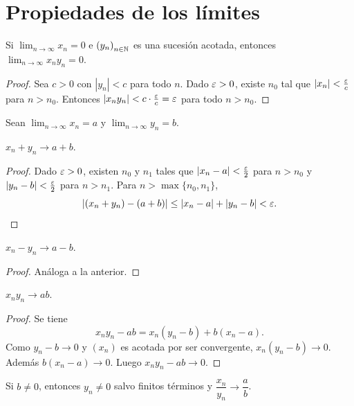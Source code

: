\section{Propiedades de los límites}

\begin{theorem}
  Si \(\lim_{n \to \infty} x_n = 0\) e \({(y_n)}_{n \in \mathbb{N}}\) es una sucesión acotada, entonces \(\lim_{n \to \infty} x_n y_n = 0\).
\end{theorem}

\begin{proof}
  Sea \(c > 0\) con \(|y_n| < c\) para todo \(n\). Dado \(\varepsilon > 0\), existe \(n_0\) tal que \(|x_n| < \frac{\varepsilon}{c}\) para \(n > n_0\). Entonces \(|x_n y_n| < c \cdot \frac{\varepsilon}{c} = \varepsilon\) para todo \(n > n_0\).
\end{proof}

Sean \(\lim_{n \to \infty} x_n = a\) y \(\lim_{n \to \infty} y_n = b\).

\begin{prop}
  \(x_n + y_n \to a + b\).
\end{prop}

\begin{proof}
  Dado \(\varepsilon > 0\), existen \(n_0\) y \(n_1\) tales que \(|x_n - a| < \frac{\varepsilon}{2}\) para \(n > n_0\) y \(|y_n - b| < \frac{\varepsilon}{2}\) para \(n > n_1\). Para \(n > \max\{n_0, n_1\}\),
  \[
    |(x_n + y_n) - (a + b)| \leq |x_n - a| + |y_n - b| < \varepsilon. \qedhere
  \]
\end{proof}

\begin{prop}
  \(x_n - y_n \to a - b\).
\end{prop}

\begin{proof}
  Análoga a la anterior.
\end{proof}

\begin{prop}
  \(x_n y_n \to a b\).
\end{prop}

\begin{proof}
  Se tiene
  \[
    x_n y_n - a b = x_n (y_n - b) + b (x_n - a).
  \]
  Como \(y_n - b \to 0\) y \((x_n)\) es acotada por ser convergente, \(x_n (y_n - b) \to 0\). Además \(b (x_n - a) \to 0\). Luego \(x_n y_n - ab \to 0\).
\end{proof}

\begin{prop}
  Si \(b \neq 0\), entonces \(y_n \neq 0\) salvo finitos términos y \(\dfrac{x_n}{y_n} \to \dfrac{a}{b}\).
\end{prop}

